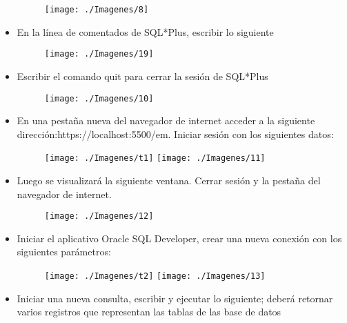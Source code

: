 \begin{itemize}
		\begin{figure}[H]
		\begin{center}
		\texttt{[image: ./Imagenes/8]}
		\end{center}
		\end{figure}
	\item En la línea de comentados de SQL*Plus, escribir lo siguiente
		\begin{figure}[H]
		\begin{center}
		\texttt{[image: ./Imagenes/19]}
		\end{center}
		\end{figure}
	\item Escribir el comando quit para cerrar la sesión de SQL*Plus
		\begin{figure}[H]
		\begin{center}
		\texttt{[image: ./Imagenes/10]}
		\end{center}
		\end{figure}
	\item En una pestaña nueva del navegador de internet acceder a la siguiente dirección:https://localhost:5500/em. Iniciar sesión con los siguientes datos:
		\begin{figure}[H]
		\begin{center}
		\texttt{[image: ./Imagenes/t1]}
		\texttt{[image: ./Imagenes/11]}
		\end{center}
		\end{figure}
	\item Luego se visualizará la siguiente ventana. Cerrar sesión y la pestaña del navegador de internet.
		\begin{figure}[H]
		\begin{center}
		\texttt{[image: ./Imagenes/12]}
		\end{center}
		\end{figure}
	\item Iniciar el aplicativo Oracle SQL Developer, crear una nueva conexión con los siguientes parámetros:
		\begin{figure}[H]
		\begin{center}
		\texttt{[image: ./Imagenes/t2]}
		\texttt{[image: ./Imagenes/13]}
		\end{center}
		\end{figure}
	\item Iniciar una nueva consulta, escribir y ejecutar lo siguiente; deberá retornar varios registros que representan las tablas de las base de datos

\end{itemize}
